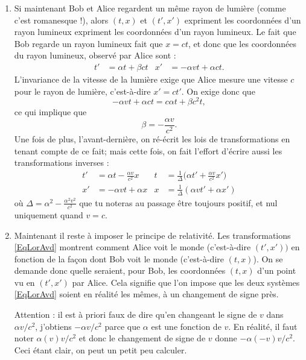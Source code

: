 \begin{enumerate}
	\item Si maintenant Bob et Alice regardent un même rayon de lumière (comme c'est romanesque !), alors \( (t,x)\) et \( (t',x')\) expriment les coordonnées d'un rayon lumineux expriment les coordonnées d'un rayon lumineux. Le fait que Bob regarde un rayon lumineux fait que \( x=ct\), et donc que les coordonnées du rayon lumineux, observé par Alice sont :
	      \begin{align}
		      t' & =\alpha t+\beta ct & x' & =-\alpha v t+\alpha c t.
	      \end{align}
	      L'invariance de la vitesse de la lumière exige que Alice mesure une vitesse \( c\) pour le rayon de lumière, c'est-à-dire \( x'=ct'\). On exige donc que
	      \[
		      -\alpha v t+\alpha ct=c\alpha t+\beta c^2t,
	      \]
	      ce qui implique que
	      \[
		      \beta=-\frac{ \alpha v }{ c^2 }.
	      \]
	      Une fois de plus, l'avant-dernière,  on ré-écrit les lois de transformations en tenant compte de ce fait; mais cette fois, on fait l'effort d'écrire aussi les transformations inverses :
	      \begin{align}	\label{EqLorAvd}
		      t' & =\alpha t-\frac{ \alpha v }{ c^2 }x & t & =\frac{1}{ \Delta }\big( \alpha t'+\frac{ \alpha v }{ c^2 }x' \big) \\
		      x' & =-\alpha vt+\alpha x                & x & =\frac{1}{ \Delta }(\alpha v t'+\alpha x')
	      \end{align}
	      où \( \Delta=\alpha^2-\frac{ \alpha^2 v^2 }{ c^2 }\) que tu noteras au passage être toujours positif, et nul uniquement quand \( v=c\).

	\item Maintenant il reste à imposer le principe de relativité. Les transformations \eqref{EqLorAvd} montrent comment Alice voit le monde (c'est-à-dire \( (t',x'))\) en fonction de la façon dont Bob voit le monde (c'est-à-dire \( (t,x)\)). On se demande donc quelle seraient, pour Bob, les coordonnées \( (t,x)\) d'un point vu en \( (t',x')\) par Alice. Cela signifie que l'on impose que les deux systèmes \eqref{EqLorAvd} soient en réalité les mêmes, à un changement de signe près.

	      Attention : il est à priori faux de dire qu'en changeant le signe de \( v\) dans \( \alpha v/c^2\), j'obtiens \( -\alpha v/c^2\) parce que \( \alpha\) est une fonction de \( v\). En réalité, il faut noter \( \alpha(v)v/c^2\) et donc le changement de signe de \( v\) donne \( -\alpha(-v)v/c^2\). Ceci étant clair, on peut un petit peu calculer.


\end{enumerate}

